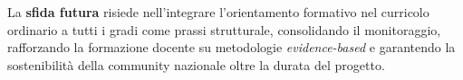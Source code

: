 \documentclass[12pt,a4paper]{article}
\begin{document}
La \textbf{sfida futura} risiede nell'integrare l'orientamento formativo nel curricolo ordinario a tutti i gradi come prassi strutturale, consolidando il monitoraggio, rafforzando la formazione docente su metodologie \textit{evidence-based} e garantendo la sostenibilit\`a della community nazionale oltre la durata del progetto.
\end{document}
